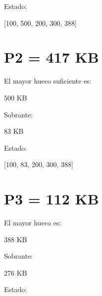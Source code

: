\documentclass[
  spanish,
  letterpaper,
]{scrbook}
\newenvironment{Shaded}{\begin{snugshade}}{\end{snugshade}}
\newcommand{\NormalTok}[1]{\textcolor[rgb]{0.00,0.23,0.31}{#1}}
\begin{document}
Estado:

\begin{Shaded}
\begin{Highlighting}[]
\NormalTok{[100, 500, 200, 300, 388]}
\end{Highlighting}
\end{Shaded}

\section{P2 = 417 KB}\label{p2-417-kb-2}

El mayor hueco suficiente es:

\begin{Shaded}
\begin{Highlighting}[]
\NormalTok{500 KB}
\end{Highlighting}
\end{Shaded}

Sobrante:

\begin{Shaded}
\begin{Highlighting}[]
\NormalTok{83 KB}
\end{Highlighting}
\end{Shaded}

Estado:

\begin{Shaded}
\begin{Highlighting}[]
\NormalTok{[100, 83, 200, 300, 388]}
\end{Highlighting}
\end{Shaded}

\section{P3 = 112 KB}\label{p3-112-kb-2}

El mayor hueco es:

\begin{Shaded}
\begin{Highlighting}[]
\NormalTok{388 KB}
\end{Highlighting}
\end{Shaded}

Sobrante:

\begin{Shaded}
\begin{Highlighting}[]
\NormalTok{276 KB}
\end{Highlighting}
\end{Shaded}

Estado:
\end{document}
